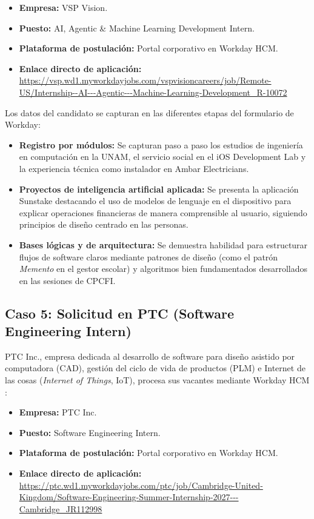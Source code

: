 \documentclass[12pt]{article}
\begin{document}
\begin{itemize}[leftmargin=0.2in, itemsep=0.2em]
    \item \textbf{Empresa:} VSP Vision.
    \item \textbf{Puesto:} AI, Agentic \& Machine Learning Development Intern.
    \item \textbf{Plataforma de postulación:} Portal corporativo en Workday HCM.
    \item \textbf{Enlace directo de aplicación:}\\ {\scriptsize\url{https://vsp.wd1.myworkdayjobs.com/vspvisioncareers/job/Remote-US/Internship--AI---Agentic---Machine-Learning-Development_R-10072}}
\end{itemize}

Los datos del candidato se capturan en las diferentes etapas del formulario de Workday:
\begin{itemize}[leftmargin=0.2in, itemsep=0.3em]
    \item \textbf{Registro por módulos:} Se capturan paso a paso los estudios de ingeniería en computación en la UNAM, el servicio social en el iOS Development Lab y la experiencia técnica como instalador en Ambar Electricians.
    \item \textbf{Proyectos de inteligencia artificial aplicada:} Se presenta la aplicación Sunstake destacando el uso de modelos de lenguaje en el dispositivo para explicar operaciones financieras de manera comprensible al usuario, siguiendo principios de diseño centrado en las personas.
    \item \textbf{Bases lógicas y de arquitectura:} Se demuestra habilidad para estructurar flujos de software claros mediante patrones de diseño (como el patrón \textit{Memento} en el gestor escolar) y algoritmos bien fundamentados desarrollados en las sesiones de CPCFI.
\end{itemize}

\subsection{Caso 5: Solicitud en PTC (Software Engineering Intern)}
\label{sec:casoPtc}

PTC Inc., empresa dedicada al desarrollo de software para diseño asistido por computadora (CAD), gestión del ciclo de vida de productos (PLM) e Internet de las cosas (\textit{Internet of Things}, IoT), procesa sus vacantes mediante Workday HCM \parencite{workday2026hcm}:

\begin{itemize}[leftmargin=0.2in, itemsep=0.2em]
    \item \textbf{Empresa:} PTC Inc.
    \item \textbf{Puesto:} Software Engineering Intern.
    \item \textbf{Plataforma de postulación:} Portal corporativo en Workday HCM.
    \item \textbf{Enlace directo de aplicación:}\\ {\scriptsize\url{https://ptc.wd1.myworkdayjobs.com/ptc/job/Cambridge-United-Kingdom/Software-Engineering-Summer-Internship-2027---Cambridge_JR112998}}
\end{itemize}
\end{document}
